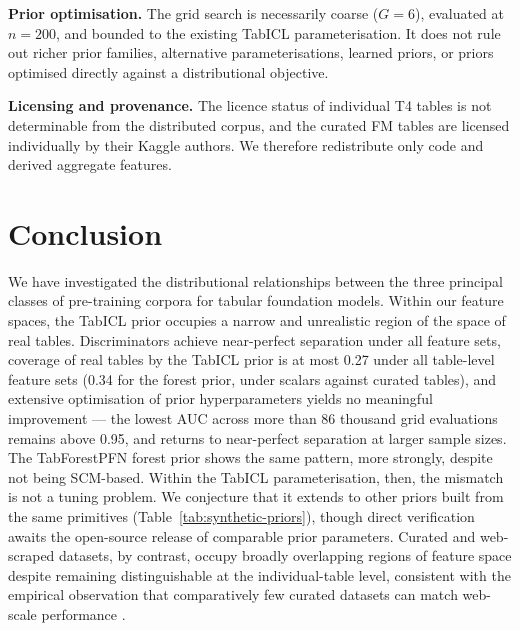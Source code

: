 \documentclass{article}
\begin{document}
\textbf{Prior optimisation.} The grid search is necessarily coarse ($G = 6$), evaluated at $n = 200$, and bounded to the existing TabICL parameterisation. It does not rule out richer prior families, alternative parameterisations, learned priors, or priors optimised directly against a distributional objective.

\textbf{Licensing and provenance.} The licence status of individual T4 tables is not determinable from the distributed corpus, and the curated FM tables are licensed individually by their Kaggle authors. We therefore redistribute only code and derived aggregate features.

\section{Conclusion}

We have investigated the distributional relationships between the three principal classes of pre-training corpora for tabular foundation models. Within our feature spaces, the TabICL prior occupies a narrow and unrealistic region of the space of real tables. Discriminators achieve near-perfect separation under all feature sets, coverage of real tables by the TabICL prior is at most 0.27 under all table-level feature sets (0.34 for the forest prior, under scalars against curated tables), and extensive optimisation of prior hyperparameters yields no meaningful improvement --- the lowest AUC across more than 86 thousand grid evaluations remains above 0.95, and returns to near-perfect separation at larger sample sizes.
The TabForestPFN forest prior shows the same pattern, more strongly, despite not being SCM-based.
Within the TabICL parameterisation, then, the mismatch is not a tuning problem. We conjecture that it extends to other priors built from the same primitives (Table~\ref{tab:synthetic-priors}), though direct verification awaits the open-source release of comparable prior parameters.
Curated and web-scraped datasets, by contrast, occupy broadly overlapping regions of feature space despite remaining distinguishable at the individual-table level, consistent with the empirical observation that comparatively few curated datasets can match web-scale performance \cite{gardnerLargeScaleTransfer2024a, wenSupervisedGenerativeNovel2024}.
\end{document}
